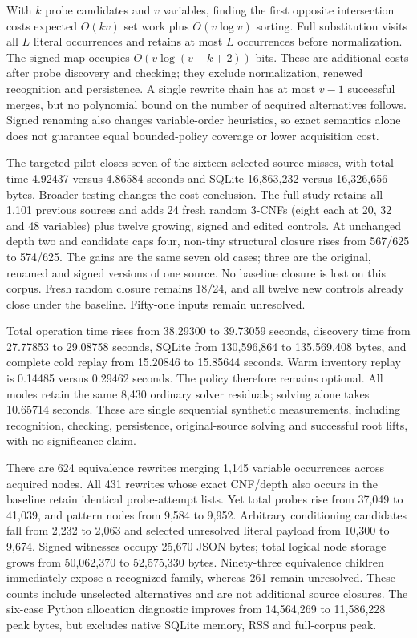 \documentclass[11pt,a4paper]{article}
\numberwithin{equation}{section}
\theoremstyle{plain}
\theoremstyle{definition}
\theoremstyle{remark}
\begin{document}
With $k$ probe candidates and $v$ variables, finding the first opposite intersection costs expected $O(kv)$ set work plus $O(v\log v)$ sorting. Full substitution visits all $L$ literal occurrences and retains at most $L$ occurrences before normalization. The signed map occupies $O(v\log(v+k+2))$ bits. These are additional costs after probe discovery and checking; they exclude normalization, renewed recognition and persistence. A single rewrite chain has at most $v-1$ successful merges, but no polynomial bound on the number of acquired alternatives follows. Signed renaming also changes variable-order heuristics, so exact semantics alone does not guarantee equal bounded-policy coverage or lower acquisition cost.

The targeted pilot closes seven of the sixteen selected source misses, with total time 4.92437 versus 4.86584 seconds and SQLite 16,863,232 versus 16,326,656 bytes. Broader testing changes the cost conclusion. The full study retains all 1,101 previous sources and adds 24 fresh random 3-CNFs (eight each at 20, 32 and 48 variables) plus twelve growing, signed and edited controls. At unchanged depth two and candidate caps four, non-tiny structural closure rises from 567/625 to 574/625. The gains are the same seven old cases; three are the original, renamed and signed versions of one source. No baseline closure is lost on this corpus. Fresh random closure remains 18/24, and all twelve new controls already close under the baseline. Fifty-one inputs remain unresolved.

Total operation time rises from 38.29300 to 39.73059 seconds, discovery time from 27.77853 to 29.08758 seconds, SQLite from 130,596,864 to 135,569,408 bytes, and complete cold replay from 15.20846 to 15.85644 seconds. Warm inventory replay is 0.14485 versus 0.29462 seconds. The policy therefore remains optional. All modes retain the same 8,430 ordinary solver residuals; solving alone takes 10.65714 seconds. These are single sequential synthetic measurements, including recognition, checking, persistence, original-source solving and successful root lifts, with no significance claim.

There are 624 equivalence rewrites merging 1,145 variable occurrences across acquired nodes. All 431 rewrites whose exact CNF/depth also occurs in the baseline retain identical probe-attempt lists. Yet total probes rise from 37,049 to 41,039, and pattern nodes from 9,584 to 9,952. Arbitrary conditioning candidates fall from 2,232 to 2,063 and selected unresolved literal payload from 10,300 to 9,674. Signed witnesses occupy 25,670 JSON bytes; total logical node storage grows from 50,062,370 to 52,575,330 bytes. Ninety-three equivalence children immediately expose a recognized family, whereas 261 remain unresolved. These counts include unselected alternatives and are not additional source closures. The six-case Python allocation diagnostic improves from 14,564,269 to 11,586,228 peak bytes, but excludes native SQLite memory, RSS and full-corpus peak.
\end{document}
